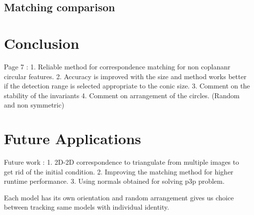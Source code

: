 \documentclass{bmvc2k}
\begin{document}
\subsection{Matching comparison}
%
%
%
%
%
%
%
%

\section{Conclusion}
Page 7 : 
1. Reliable method for correspondence matching for non coplananr circular features. 
2. Accuracy is improved with the size and method works better if the detection range is selected appropriate to the conic size. 
3. Comment on the stability of the invariants 
4. Comment on arrangement of the circles. (Random and non symmetric)


\section{Future Applications}
Future work : 
1. 2D-2D correspondence to triangulate from multiple images to get rid of the initial condition. 
2. Improving the matching method for higher runtime performance.
3. Using normals obtained for solving p3p problem. 

Each model has its own orientation and random arrangement gives us choice between tracking same models with individual identity. 



\end{document}
